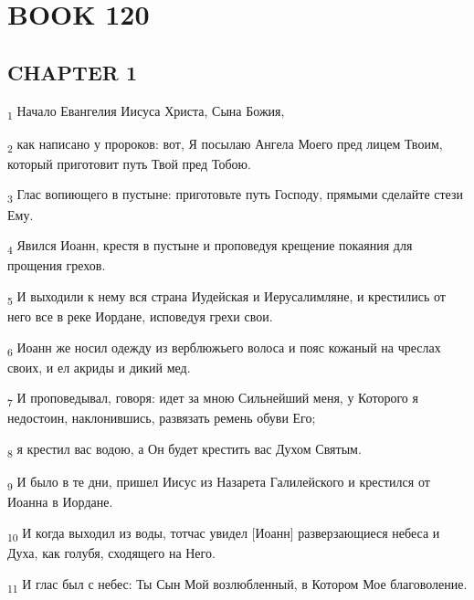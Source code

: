 \section{BOOK 120}
\subsection{CHAPTER 1}
\begin{tcolorbox}
\textsubscript{1} Начало Евангелия Иисуса Христа, Сына Божия,
\end{tcolorbox}
\begin{tcolorbox}
\textsubscript{2} как написано у пророков: вот, Я посылаю Ангела Моего пред лицем Твоим, который приготовит путь Твой пред Тобою.
\end{tcolorbox}
\begin{tcolorbox}
\textsubscript{3} Глас вопиющего в пустыне: приготовьте путь Господу, прямыми сделайте стези Ему.
\end{tcolorbox}
\begin{tcolorbox}
\textsubscript{4} Явился Иоанн, крестя в пустыне и проповедуя крещение покаяния для прощения грехов.
\end{tcolorbox}
\begin{tcolorbox}
\textsubscript{5} И выходили к нему вся страна Иудейская и Иерусалимляне, и крестились от него все в реке Иордане, исповедуя грехи свои.
\end{tcolorbox}
\begin{tcolorbox}
\textsubscript{6} Иоанн же носил одежду из верблюжьего волоса и пояс кожаный на чреслах своих, и ел акриды и дикий мед.
\end{tcolorbox}
\begin{tcolorbox}
\textsubscript{7} И проповедывал, говоря: идет за мною Сильнейший меня, у Которого я недостоин, наклонившись, развязать ремень обуви Его;
\end{tcolorbox}
\begin{tcolorbox}
\textsubscript{8} я крестил вас водою, а Он будет крестить вас Духом Святым.
\end{tcolorbox}
\begin{tcolorbox}
\textsubscript{9} И было в те дни, пришел Иисус из Назарета Галилейского и крестился от Иоанна в Иордане.
\end{tcolorbox}
\begin{tcolorbox}
\textsubscript{10} И когда выходил из воды, тотчас увидел [Иоанн] разверзающиеся небеса и Духа, как голубя, сходящего на Него.
\end{tcolorbox}
\begin{tcolorbox}
\textsubscript{11} И глас был с небес: Ты Сын Мой возлюбленный, в Котором Мое благоволение.
\end{tcolorbox}
